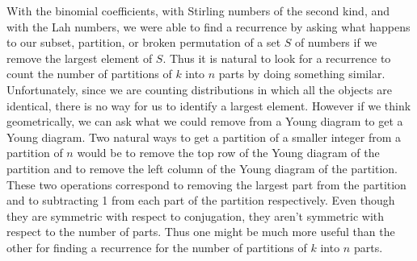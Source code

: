 \documentclass[10pt,]{book}
\theoremstyle{plain}
\theoremstyle{definition}
\theoremstyle{definition}
\numberwithin{equation}{chapter}
\begin{document}
With the binomial coefficients, with Stirling numbers of the second kind, and with the Lah numbers, we were able to find a recurrence by asking what happens to our subset, partition, or broken permutation of a set \(S\) of numbers if we remove the largest element of \(S\). Thus it is natural to look for a recurrence to count the number of partitions of \(k\) into \(n\) parts by doing something similar. Unfortunately, since we are counting distributions in which all the objects are identical, there is no way for us to identify a largest element. However if we think geometrically, we can ask what we could remove from a Young diagram to get a Young diagram. Two natural ways to get a partition of a smaller integer from a partition of \(n\) would be to remove the top row of the Young diagram of the partition and to remove the left column of the Young diagram of the partition. These two operations correspond to removing the largest part from the partition and to subtracting 1 from each part of the partition respectively. Even though they are symmetric with respect to conjugation, they aren't symmetric with respect to the number of parts. Thus one might be much more useful than the other for finding a recurrence for the number of partitions of \(k\) into \(n\) parts.%
\end{document}
